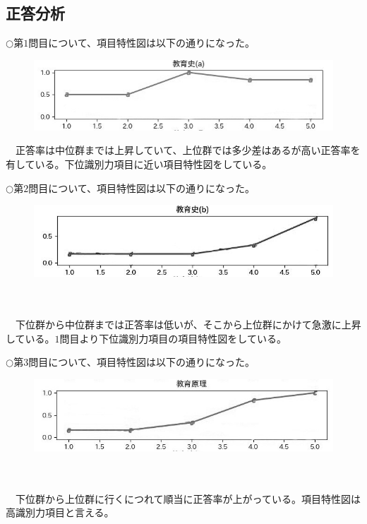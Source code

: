 \documentclass[12pt]{jarticle}
\numberwithin{equation}{subsection}
\begin{document}
\subsection{正答分析}
$\bigcirc$第$1$問目について、項目特性図は以下の通りになった。
\vspace{2cm}
\begin{figure}[H]
  \includegraphics[bb = -50 60 1 1,scale = 0.6]{Figure_1.jpg}
  \vspace{1cm}
\end{figure}

\ \ 正答率は中位群までは上昇していて、上位群では多少差はあるが高い正答率を有している。下位識別力項目に近い項目特性図をしている。

$\bigcirc$第$2$問目について、項目特性図は以下の通りになった。
\vspace{1cm}
\begin{figure}[H]
  \includegraphics[bb = -50 60 1 1,scale = 0.6]{Figure_2.jpg}
\end{figure}
\leavevmode \\
\\
\ \ 下位群から中位群までは正答率は低いが、そこから上位群にかけて急激に上昇している。$1$問目より下位識別力項目の項目特性図をしている。

$\bigcirc$第$3$問目について、項目特性図は以下の通りになった。
\vspace{1cm}
\begin{figure}[H]
  \includegraphics[bb = -40 60 1 1,scale = 0.8]{Figure_3.jpg}
\end{figure}
\leavevmode \\
\\
\ \ 下位群から上位群に行くにつれて順当に正答率が上がっている。項目特性図は高識別力項目と言える。
\end{document}

